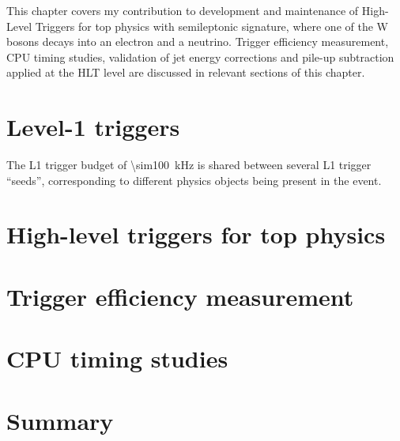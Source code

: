 This chapter covers my contribution to development and maintenance of High-Level Triggers for top physics with
semileptonic signature, where one of the W bosons decays into an electron and a neutrino. Trigger efficiency
measurement, CPU timing studies, validation of jet energy corrections and pile-up subtraction applied at the HLT level
are discussed in relevant sections of this chapter.

\section{Level-1 triggers}
The L1 trigger budget of \SI{\sim100}{\kilo\hertz} is shared between several L1 trigger ``seeds'', corresponding to
different physics objects being present in the event.

\section{High-level triggers for top physics}

\section{Trigger efficiency measurement}

\section{CPU timing studies}

\section{Summary}





